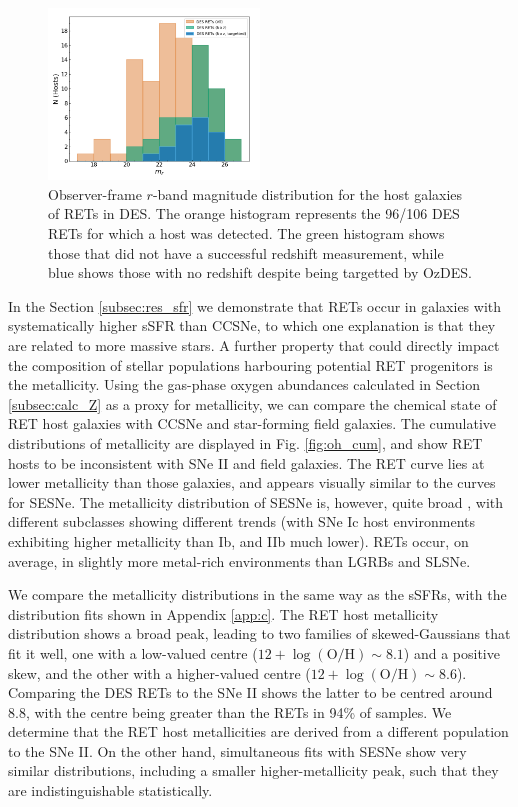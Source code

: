 \documentclass[fleqn,usenatbib,]{mnras}
\begin{document}
\begin{figure}
\includegraphics[width=0.5\textwidth]{figs/mag_dist.png}
\caption{Observer-frame $r$-band magnitude distribution for the host galaxies of RETs in DES. The orange histogram represents the 96/106 DES RETs for which a host was detected. The green histogram shows those that did not have a successful redshift measurement, while blue shows those with no redshift despite being targetted by OzDES.
\label{fig:mag_dist}}
\end{figure}

In the Section \ref{subsec:res_sfr} we demonstrate that RETs occur in galaxies with systematically higher sSFR than CCSNe, to which one explanation is that they are related to more massive stars. A further property that could directly impact the composition of stellar populations harbouring potential RET progenitors is the metallicity. Using the gas-phase oxygen abundances calculated in Section \ref{subsec:calc_Z} as a proxy for metallicity, we can compare the chemical state of RET host galaxies with CCSNe and star-forming field galaxies. The cumulative distributions of metallicity are displayed in Fig. \ref{fig:oh_cum}, and show RET hosts to be inconsistent with SNe II and field galaxies. The RET curve lies at lower metallicity than those galaxies, and appears visually similar to the curves for SESNe. The metallicity distribution of SESNe is, however, quite broad \citep[e.g.][]{Anderson2010}, with different subclasses showing different trends (with SNe Ic host environments exhibiting higher metallicity than Ib, and IIb much lower). RETs occur, on average, in slightly more metal-rich environments than LGRBs and SLSNe.

We compare the metallicity distributions in the same way as the sSFRs, with the distribution fits shown in Appendix \ref{app:c}. The RET host metallicity distribution shows a broad peak, leading to two families of skewed-Gaussians that fit it well, one with a low-valued centre  ($12 + \log \mathrm{(O/H)} \sim 8.1$) and a positive skew, and the other with a higher-valued centre ($12 + \log \mathrm{(O/H)} \sim 8.6$). Comparing the DES RETs to the \citet{Stoll2013} SNe II shows the latter to be centred around 8.8, with the centre being greater than the RETs in 94\% of samples. We determine that the RET host metallicities are derived from a different population to the SNe II. On the other hand, simultaneous fits with SESNe show very similar distributions, including a smaller higher-metallicity peak, such that they are indistinguishable statistically. 
\end{document}
